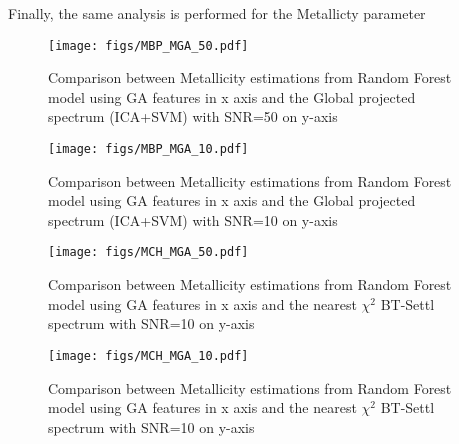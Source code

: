 { 

Finally, the same analysis is performed for the Metallicty parameter

\begin {figure}
 \begin{center}
 \texttt{[image: figs/MBP\_MGA\_50.pdf]}
 \caption{Comparison between Metallicity estimations from 
 Random Forest model using GA features  in x axis and 
 the Global projected spectrum (ICA+SVM) with SNR=50 on y-axis}
 \label{fig:Mbp_Mga_50}
 \end{center}
\end {figure}

\begin {figure}
 \begin{center}
 \texttt{[image: figs/MBP\_MGA\_10.pdf]}
 \caption{Comparison between Metallicity estimations from 
 Random Forest model using GA features  in x axis and 
 the Global projected spectrum (ICA+SVM) with SNR=10 on y-axis}
 \label{fig:Mbp_Mga_10}
 \end{center}
\end {figure}

\begin {figure}
 \begin{center}
 \texttt{[image: figs/MCH\_MGA\_50.pdf]}
 \caption{Comparison between Metallicity estimations from 
 Random Forest model using GA features  in x axis and 
 the nearest $\chi^2$ BT-Settl spectrum with SNR=10 on y-axis}
 \label{fig:Mch_Mga_50}
 \end{center}
\end {figure}

\begin {figure}
 \begin{center}
 \texttt{[image: figs/MCH\_MGA\_10.pdf]}
 \caption{Comparison between Metallicity estimations from 
 Random Forest model using GA features  in x axis and 
 the nearest $\chi^2$ BT-Settl spectrum with SNR=10 on y-axis}
 \label{fig:Mch_Mga_10}
 \end{center}
\end {figure}

}

